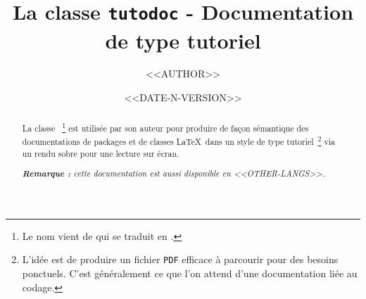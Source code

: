 \documentclass[10pt, a4paper]{../main/main}
\begin{document}
\title{La classe \texttt{tutodoc} - Documentation de type tutoriel}
\author{<<AUTHOR>>}
\date{<<DATE-N-VERSION>>}

\maketitle

\begin{abstract}
    La classe \thisproj{}\,%
    \footnote{
        Le nom vient de  qui se traduit en .
    }
    est utilisée par son auteur pour produire de façon sémantique des documentations de packages et de classes \LaTeX\ dans un style de type tutoriel\,%
    \footnote{
        L'idée est de produire un fichier \texttt{PDF} efficace à parcourir pour des besoins ponctuels. C'est généralement ce que l'on attend d'une documentation liée au codage.
    }
    via un rendu sobre pour une lecture sur écran.

    \smallskip

	\noindent
    \emph{\textbf{Remarque :} cette documentation est aussi disponible en <<OTHER-LANGS>>.}
\end{abstract}
\end{document}
